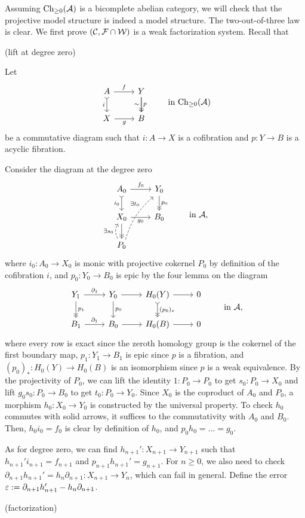\documentclass{../../large}
\begin{document}
\begin{pf}
Assuming $\mathrm{Ch}_{\ge0}(\mathcal{A})$ is a bicomplete abelian category, we will check that the projective model structure is indeed a model structure.
The two-out-of-three law is clear.
We first prove $(\mathcal{C},\mathcal{F}\cap\mathcal{W})$ is a weak factorization system.
Recall that 


(lift at degree zero)

Let
\[\begin{tikzcd}
A \dar[>->,swap]{i} \rar{f} & Y \dar[->>]{p}\dar[swap]{\sim} \\
X \rar[swap]{g} & B
\end{tikzcd}\qquad\text{ in }\mathrm{Ch}_{\ge0}(\cA)\]
be a commutative diagram such that $i:A\to X$ is a cofibration and $p:Y\to B$ is a acyclic fibration.

Consider the diagram at the degree zero
\[\begin{tikzcd}
A_0\rar{f_0}\dar[>->,swap]{i_0}&Y_0\dar[->>]{p_0}\\
X_0\rar[swap]{g_0}\dar[->>]&B_0\\
P_0\uar[dashed,bend left]{\exists s_0}\ar[dashed,bend left=16,shift right=1,pos=.7]{uur}{\exists t_0}&
\end{tikzcd}\qquad\text{ in }\cA,\]
where $i_0:A_0\to X_0$ is monic with projective cokernel $P_0$ by definition of the cofibration $i$, and $p_0:Y_0\to B_0$ is epic by the four lemma on the diagram
\[\begin{tikzcd}
Y_1\rar{\partial_1}\dar[->>]{p_1}&Y_0\rar\dar{p_0}&H_0(Y)\dar[>->>]{(p_0)_*} \rar&0\\
B_1\rar{\partial_1}&B_0\rar&H_0(B)\rar&0
\end{tikzcd}\qquad\text{ in }\cA,\]
where every row is exact since the zeroth homology group is the cokernel of the first boundary map, $p_1:Y_1\to B_1$ is epic since $p$ is a fibration, and $(p_0)_*:H_0(Y)\to H_0(B)$ is an isomorphism since $p$ is a weak equivalence.
By the projectivity of $P_0$, we can lift the identity $1:P_0\to P_0$ to get $s_0:P_0\to X_0$ and lift $g_0s_0:P_0\to B_0$ to get $t_0:P_0\to Y_0$.
Since $X_0$ is the coproduct of $A_0$ and $P_0$, a morphism $h_0:X_0\to Y_0$ is constructed by the universal property.
To check $h_0$ commutes with solid arrows, it suffices to the commutativity with $A_0$ and $B_0$.
Then, $h_0i_0=f_0$ is clear by definition of $h_0$, and $p_0h_0=...=g_0$.

As for degree zero, we can find $h_{n+1}':X_{n+1}\to Y_{n+1}$ such that $h_{n+1}'i_{n+1}=f_{n+1}$ and $p_{n+1}h_{n+1}'=g_{n+1}$.
For $n\ge0$, we also need to check $\partial_{n+1}h_{n+1}'=h_n\partial_{n+1}:X_{n+1}\to Y_n$, which can fail in general.
Define the error $\varepsilon:=\partial_{n+1}h_{n+1}'-h_n\partial_{n+1}$.



(factorization)

\end{pf}
\end{document}
